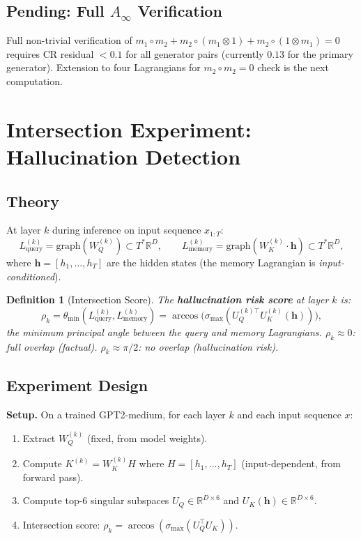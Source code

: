 \documentclass[11pt]{amsart}
\newtheorem{definition}[theorem]{Definition}
\begin{document}
\subsection{Pending: Full $A_\infty$ Verification}

Full non-trivial verification of $m_1\circ m_2+m_2\circ(m_1\otimes 1)+m_2\circ(1\otimes m_1)=0$
requires CR residual $<0.1$ for all generator pairs (currently $0.13$ for
the primary generator).
Extension to four Lagrangians for $m_2\circ m_2=0$ check is the next
computation.

\section{Intersection Experiment: Hallucination Detection}
\label{sec:intersection_exp}

\subsection{Theory}

At layer $k$ during inference on input sequence $x_{1:T}$:
\[
  L_\text{query}^{(k)} = \mathrm{graph}(W_Q^{(k)}) \subset T^*\mathbb{R}^D,
  \qquad
  L_\text{memory}^{(k)} = \mathrm{graph}(W_K^{(k)}\cdot\mathbf{h}) \subset T^*\mathbb{R}^D,
\]
where $\mathbf{h} = [h_1,\ldots,h_T]$ are the hidden states
(the memory Lagrangian is \emph{input-conditioned}).

\begin{definition}[Intersection Score]
The \textbf{hallucination risk score} at layer $k$ is:
\[
  \rho_k = \theta_\mathrm{min}(L_\text{query}^{(k)}, L_\text{memory}^{(k)})
  = \arccos\bigl(\sigma_\mathrm{max}(U_Q^{(k)\top} U_K^{(k)}(\mathbf{h}))\bigr),
\]
the minimum principal angle between the query and memory Lagrangians.
$\rho_k \approx 0$: full overlap (factual).
$\rho_k \approx \pi/2$: no overlap (hallucination risk).
\end{definition}

\subsection{Experiment Design}

\textbf{Setup.} On a trained GPT2-medium, for each layer $k$ and each
input sequence $x$:
\begin{enumerate}
\item Extract $W_Q^{(k)}$ (fixed, from model weights).
\item Compute $K^{(k)} = W_K^{(k)} H$ where $H = [h_1,\ldots,h_T]$
  (input-dependent, from forward pass).
\item Compute top-6 singular subspaces $U_Q \in \mathbb{R}^{D\times 6}$
  and $U_K(\mathbf{h}) \in \mathbb{R}^{D\times 6}$.
\item Intersection score: $\rho_k = \arccos(\sigma_\mathrm{max}(U_Q^\top U_K))$.
\end{enumerate}
\end{document}
